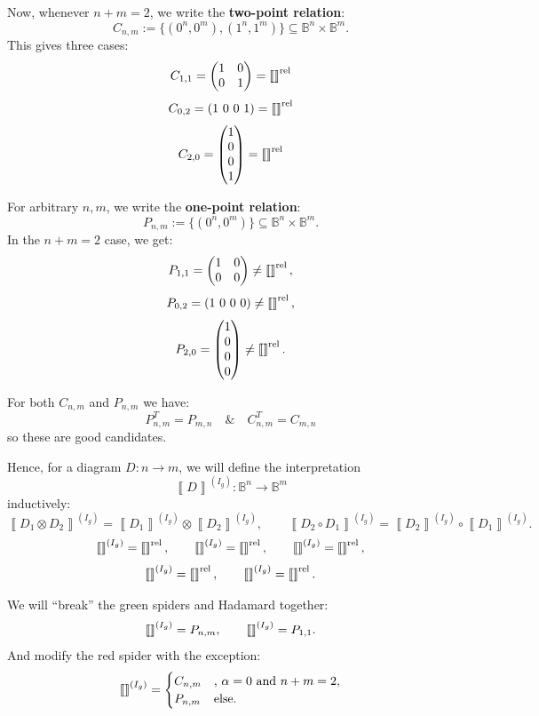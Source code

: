 \documentclass[copyright,creativecommons]{eptcs}
\newcommand{\typedfig}[1]{\IfFileExists{latex_typed/b_rule_note/figures/#1.tikz}{}{}}
\newcommand{\zxfig}[1]{\vcenter{\hbox{\scalebox{1}{\typedfig{#1}}}}}
\newcommand{\sem}[1]{\left\llbracket #1 \right\rrbracket}
\newcommand{\bool}{\mathbb{B}}
\theoremstyle{definition}
\theoremstyle{remark}
\begin{document}
Now, whenever \(n+m=2\), we write the \textbf{two-point relation}:
\[
C_{n,m}:=\{(0^n,0^m),(1^n,1^m)\}\subseteq \bool^n\times\bool^m.
\]
This gives three cases:
\[
C_{1,1}=
\begin{pmatrix}1&0\\0&1\end{pmatrix}
=\sem{\zxfig{single-line}}^{\mathrm{rel}}
\]
\[
C_{0,2}=(1\ 0\ 0\ 1)
=\sem{\zxfig{cup}}^{\mathrm{rel}}
\]
\[
C_{2,0}=
\begin{pmatrix}1\\0\\0\\1\end{pmatrix}
=\sem{\zxfig{caps}}^{\mathrm{rel}}
\]

For arbitrary \(n,m\), we write the \textbf{one-point relation}:
\[
P_{n,m}:=\{(0^n,0^m)\}\subseteq \bool^n\times\bool^m.
\]
In the \(n+m=2\) case, we get:
\[
P_{1,1}=
\begin{pmatrix}1&0\\0&0\end{pmatrix}
\ne \sem{\zxfig{single-line}}^{\mathrm{rel}},
\]
\[
P_{0,2}=(1\ 0\ 0\ 0)
\ne \sem{\zxfig{cup}}^{\mathrm{rel}},
\]
\[
P_{2,0}=
\begin{pmatrix}1\\0\\0\\0\end{pmatrix}
\ne \sem{\zxfig{caps}}^{\mathrm{rel}}.
\]

For both \(C_{n,m}\) and \(P_{n,m}\) we have:
\[
P_{n,m}^T=P_{m,n}\quad \& \quad C_{n,m}^T=C_{m,n}
\]
so these are good candidates.

Hence, for a diagram \(D:n\to m\), we will define the interpretation
\[
\sem{D}^{(I_g)}:\bool^n\to\bool^m
\]
inductively:
\[
\sem{D_1\otimes D_2}^{(I_g)}=\sem{D_1}^{(I_g)}\otimes\sem{D_2}^{(I_g)},
\qquad
\sem{D_2\circ D_1}^{(I_g)}=\sem{D_2}^{(I_g)}\circ\sem{D_1}^{(I_g)}.
\]
\[
\sem{\zxfig{empty-diagram}}^{(I_g)}=\sem{\zxfig{empty-diagram}}^{\mathrm{rel}},
\qquad
\sem{\zxfig{single-line}}^{(I_g)}=\sem{\zxfig{single-line}}^{\mathrm{rel}},
\qquad
\sem{\zxfig{crossing}}^{(I_g)}=\sem{\zxfig{crossing}}^{\mathrm{rel}},
\]
\[
\sem{\zxfig{cup}}^{(I_g)}=\sem{\zxfig{cup}}^{\mathrm{rel}},
\qquad
\sem{\zxfig{caps}}^{(I_g)}=\sem{\zxfig{caps}}^{\mathrm{rel}}.
\]

We will ``break'' the green spiders and Hadamard together:
\[
\sem{\zxfig{gn-alpha}}^{(I_g)}=P_{n,m},
\qquad
\sem{\zxfig{Hadamard}}^{(I_g)}=P_{1,1}.
\]
And modify the red spider with the exception:
\[
\sem{\zxfig{rn-alpha}}^{(I_g)}=
\begin{cases}
C_{n,m} & \text{, }\alpha=0\text{ and }n+m=2,\\
P_{n,m} & \text{else.}
\end{cases}
\]
\end{document}
